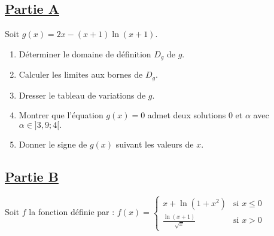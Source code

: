     \section*{}

    \subsection*{\underline{\textbf{Partie A}}}

    Soit  \( g(x) = 2x - (x+1) \ln(x+1). \)

    \begin{enumerate}
        \item Déterminer le domaine de définition \( D_g \) de \( g \).
        \item Calculer les limites aux bornes de \( D_g \).
        \item Dresser le tableau de variations de \( g \).
        \item Montrer que l’équation \( g(x) = 0 \) admet deux solutions \( 0 \) et \( \alpha \) avec
              \(     \alpha \in ]3,9; 4[. \)
        \item Donner le signe de \( g(x) \) suivant les valeurs de \( x \).
    \end{enumerate}

    \subsection*{\underline{\textbf{Partie B}}}

    Soit \( f \) la fonction définie par :
    \( f(x) =
    \begin{cases}
        x + \ln(1 + x^2)          & \text{si } x \leq 0 \\
        \frac{\ln(x+1)}{\sqrt{x}} & \text{si } x > 0
    \end{cases} \)

